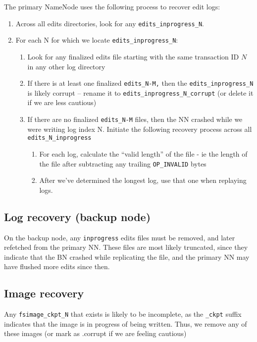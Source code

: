 \documentclass{article}
\begin{document}
The primary NameNode uses the following process to recover edit logs:
\begin{enumerate}
  \item Across all edits directories, look for any {\tt edits\_inprogress\_N}.
  \item For each N for which we locate {\tt edits\_inprogress\_N}:
  \begin{enumerate}
    \item Look for any finalized edits file starting with the same transaction ID $N$ in any other log directory
    \item If there is at least one finalized {\tt edits\_N-M,} then the {\tt edits\_inprogress\_N} is likely corrupt – rename it to {\tt edits\_inprogress\_N\_corrupt} (or delete it if we are less cautious)
    \item If there are no finalized {\tt edits\_N-M} files, then the NN crashed while we were writing log index N. Initiate the following recovery process across all {\tt edits\_N\_inprogress}
    \begin{enumerate}
      \item  For each log, calculate the ``valid length'' of the file - ie the length of the file after subtracting any trailing {\tt OP\_INVALID} bytes
      \item  After we've determined the longest log, use that one when replaying logs.
    \end{enumerate}
  \end{enumerate}
\end{enumerate}

\subsection{Log recovery (backup node)}\label{bnrecovery}

On the backup node, any {\tt inprogress} edits files must be removed, and later refetched from the primary NN.
These files are most likely truncated, since they indicate that the BN crashed while replicating the file, and the
primary NN may have flushed more edits since then.

\subsection{Image recovery}

Any {\tt fsimage\_ckpt\_N} that exists is likely to be incomplete, as the {\tt \_ckpt} suffix indicates that the image is in progress of being written. Thus, we remove any of these images (or mark as .corrupt if we are feeling cautious)
\end{document}
